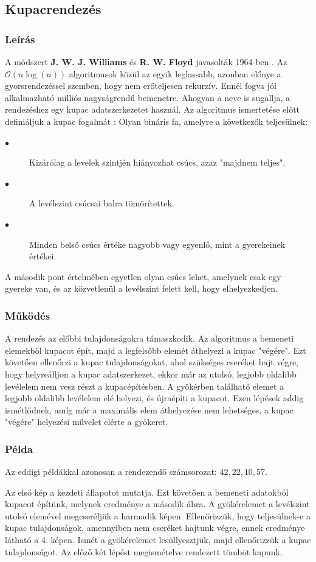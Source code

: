 \documentclass{elteikthesis}
\newcommand{\hiddensubsubsection}[1]{
	\stepcounter{subsubsection}
	\subsubsection*{{#1}}	
}
\begin{document}
\subsection{Kupacrendezés}
\hiddensubsubsection{Leírás}
A módszert \textbf{J. W. J. Williams} és \textbf{R. W. Floyd} javasolták 1964-ben \cite{Ronyai}.
Az $\mathcal{O}(n\log (n))$ algoritmusok közül az egyik leglassabb, azonban előnye a gyorsrendezéssel szemben, hogy nem erőteljesen rekurzív. Ennél fogva jól alkalmazható milliós nagyságrendű bemenetre. Ahogyan a neve is sugallja, a rendezéshez egy kupac adatszerkezetet használ. Az algoritmus ismertetése előtt definiáljuk a kupac fogalmát \cite{Fekete}:
Olyan bináris fa, amelyre a következők teljesülnek:
\begin{description}
	\item[$\bullet$] Kizárólag a levelek szintjén hiányozhat csúcs, azaz "majdnem teljes".
	\item[$\bullet$] A levélszint csúcsai balra tömörítettek.
	\item[$\bullet$] Minden belső csúcs értéke nagyobb vagy egyenlő, mint a gyerekeinek értékei.
\end{description}
A második pont értelmében egyetlen olyan csúcs lehet, amelynek csak egy gyereke van, és az közvetlenül a levélszint felett kell, hogy elhelyezkedjen.\par
\hiddensubsubsection{Működés}
A rendezés az előbbi tulajdonságokra támaszkodik. 
Az algoritmus a bemeneti elemekből kupacot épít, majd a legfelsőbb elemét áthelyezi a kupac "végére". Ezt követően ellenőrzi a kupac tulajdonságokat, ahol szükséges cseréket hajt végre, hogy helyreálljon a kupac adatszerkezet, ekkor már az utolsó, legjobb oldalibb levélelem nem vesz részt a kupacépítésben. A gyökérben található elemet a legjobb oldalibb levélelem elé helyezi, és újraépíti a kupacot. Ezen lépések addig ismétlődnek, amíg már a maximális elem áthelyezése nem lehetséges, a kupac "végére" helyezési művelet elérte a gyökeret.\par
 \hiddensubsubsection{Példa}
 Az eddigi példákkal azonosan a rendezendő számsorozat: $42, 22, 10, 57$.\par
 Az első kép a kezdeti állapotot mutatja. Ezt követően a bemeneti adatokból kupacot építünk, melynek eredménye a második ábra. A gyökérelemet a levélszint utolsó elemével megcseréljük a harmadik képen. Ellenőrizzük, hogy teljesülnek-e a kupac tulajdonságok, amennyiben nem cseréket hajtunk végre, ennek eredménye látható a 4. képen. Ismét a gyökérelemet lesüllyesztjük, majd ellenőrizzük a kupac tulajdonságot. Az előző két lépést megismételve rendezett tömböt kapunk.\par
\end{document}
